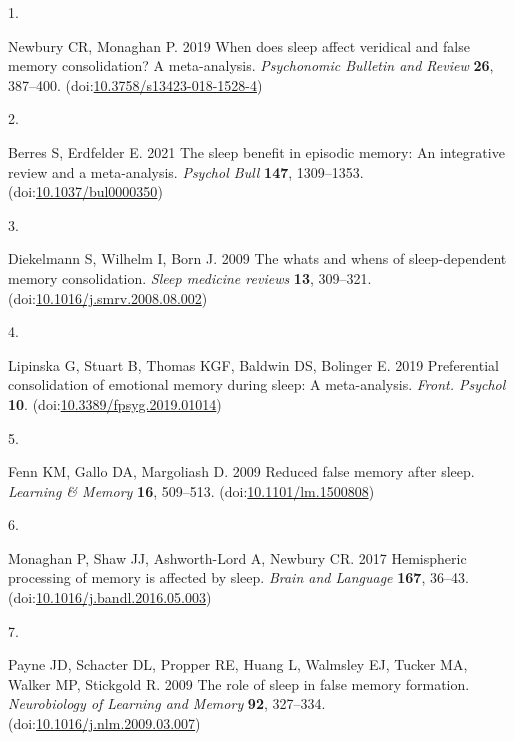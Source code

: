 \documentclass[
]{article}
\newlength{\cslhangindent}
\newlength{\csllabelwidth}
\newlength{\cslentryspacingunit} %
\newenvironment{CSLReferences}[2] %
 {%
  \setlength{\parindent}{0pt}
  \ifodd #1
  \let\oldpar\par
  \def\par{\hangindent=\cslhangindent\oldpar}
  \fi
  \setlength{\parskip}{#2\cslentryspacingunit}
 }%
 {}
\newcommand{\CSLLeftMargin}[1]{\parbox[t]{\csllabelwidth}{#1}}
\newcommand{\CSLRightInline}[1]{\parbox[t]{\linewidth - \csllabelwidth}{#1}\break}
\begin{document}
\hypertarget{refs}{}
\begin{CSLReferences}{0}{0}
\leavevmode{}%
\CSLLeftMargin{1. }%
\CSLRightInline{Newbury CR, Monaghan P. 2019 When does sleep affect veridical and false memory consolidation? A meta-analysis. \emph{Psychonomic Bulletin and Review} \textbf{26}, 387--400. (doi:\href{https://doi.org/10.3758/s13423-018-1528-4}{10.3758/s13423-018-1528-4})}

\leavevmode{}%
\CSLLeftMargin{2. }%
\CSLRightInline{Berres S, Erdfelder E. 2021 The sleep benefit in episodic memory: An integrative review and a meta-analysis. \emph{Psychol Bull} \textbf{147}, 1309--1353. (doi:\href{https://doi.org/10.1037/bul0000350}{10.1037/bul0000350})}

\leavevmode{}%
\CSLLeftMargin{3. }%
\CSLRightInline{Diekelmann S, Wilhelm I, Born J. 2009 The whats and whens of sleep-dependent memory consolidation. \emph{Sleep medicine reviews} \textbf{13}, 309--321. (doi:\href{https://doi.org/10.1016/j.smrv.2008.08.002}{10.1016/j.smrv.2008.08.002})}

\leavevmode{}%
\CSLLeftMargin{4. }%
\CSLRightInline{Lipinska G, Stuart B, Thomas KGF, Baldwin DS, Bolinger E. 2019 Preferential consolidation of emotional memory during sleep: A meta-analysis. \emph{Front. Psychol} \textbf{10}. (doi:\href{https://doi.org/10.3389/fpsyg.2019.01014}{10.3389/fpsyg.2019.01014})}

\leavevmode{}%
\CSLLeftMargin{5. }%
\CSLRightInline{Fenn KM, Gallo DA, Margoliash D. 2009 Reduced false memory after sleep. \emph{Learning \& Memory} \textbf{16}, 509--513. (doi:\href{https://doi.org/10.1101/lm.1500808}{10.1101/lm.1500808})}

\leavevmode{}%
\CSLLeftMargin{6. }%
\CSLRightInline{Monaghan P, Shaw JJ, Ashworth-Lord A, Newbury CR. 2017 Hemispheric processing of memory is affected by sleep. \emph{Brain and Language} \textbf{167}, 36--43. (doi:\href{https://doi.org/10.1016/j.bandl.2016.05.003}{10.1016/j.bandl.2016.05.003})}

\leavevmode{}%
\CSLLeftMargin{7. }%
\CSLRightInline{Payne JD, Schacter DL, Propper RE, Huang L, Walmsley EJ, Tucker MA, Walker MP, Stickgold R. 2009 The role of sleep in false memory formation. \emph{Neurobiology of Learning and Memory} \textbf{92}, 327--334. (doi:\href{https://doi.org/10.1016/j.nlm.2009.03.007}{10.1016/j.nlm.2009.03.007})}


\end{CSLReferences}
\end{document}
